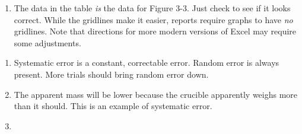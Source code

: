 \documentclass{article}
\begin{document}
\begin{enumerate}[start=5]
\item The data in the table \emph{is} the data for Figure 3-3. Just check to
	see if it looks correct. While the gridlines make it easier, reports
	require graphs to have \emph{no} gridlines. Note that directions for
	more modern versions of Excel may require some adjustments.
\end{enumerate}

\begin{enumerate}[start=10]
	\item Systematic error is a constant, correctable error. Random error
		is always present. More trials should bring random error down.
	\item The apparent mass will be lower because the crucible apparently
		weighs more than it should. This is an example of systematic
		error.
	\item {}
\end{enumerate}
\end{document}
